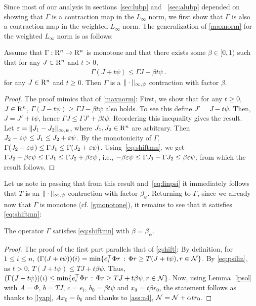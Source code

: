 Since most of our analysis in sections~\ref{sec:lubp} and ~\ref{sec:alubp} depended on showing that $\Gamma$ is a contraction map in the $L_\infty$ norm, we first show that $\Gamma$ is also a contraction map in the weighted $L_\infty$ norm.
The generalization of  \cref{maxnorm} for the weighted $L_{\infty}$ norm is as follows:
\begin{lemma}\label{maxnormmn}
Assume that $\Gamma: \mathrm{R}^n \to \mathrm{R}^n$ is monotone and 
that there exists some $\beta\in [0,1)$ such that for any $J\in \mathrm{R}^n$ and $t>0$,
\begin{align}
\label{eq:shiftmn}
\Gamma( J + t \psi) \le \Gamma J + \beta t \psi\,.
\end{align} 
for any $J\in \mathrm{R}^n$ and $t\ge 0$.
Then $\Gamma$ is a $\|\cdot\|_{\infty,\psi}$ contraction with factor $\beta$.
\end{lemma}
\begin{proof}
The proof mimics that of  \cref{maxnorm}:
First, we show that for any $t\ge 0$,  $J\in \mathrm{R}^n$,
$\Gamma( J - t \psi) \ge \Gamma J - \beta t \psi$ also holds.
To see this define $J' = J-t\psi$. Then, $J = J'+t\psi$, hence $\Gamma J \le \Gamma J' + \beta t \psi$. Reordering this inequality gives the result.
Let $\varepsilon = \|J_1 - J_2\|_{\infty,\psi}$, where $J_1,J_2\in \mathrm{R}^n$ are arbitrary.
Then $J_2 - \varepsilon \psi \le J_1 \le J_2 + \varepsilon \psi$. 
By the monotonicity of $\Gamma$,
$\Gamma(J_2 - \varepsilon \psi) \le \Gamma J_1 \le \Gamma(J_2 + \varepsilon \psi)$. 
Using~\eqref{eq:shiftmn}, we get 
$\Gamma J_2 - \beta \varepsilon \psi \le \Gamma J_1 \le \Gamma J_2 + \beta \varepsilon \psi$, i.e., $-\beta \varepsilon \psi \le \Gamma J_1 - \Gamma J_2 \le \beta \varepsilon \psi$, from which the result follows.
\end{proof}
Let us note in passing that from this result and~\eqref{eq:linpsi} it immediately follows that $T$ is an $\|\cdot\|_{\infty,\psi}$-contraction with factor $\beta_{\psi}$.
Returning to $\Gamma$,
since we already now that $\Gamma$ is monotone (cf. \cref{gmonotone}), it remains to see that it satisfies \eqref{eq:shiftmn}:
\begin{lemma}\label{gshiftmn}
The operator $\Gamma$ satisfies \eqref{eq:shiftmn} with $\beta = \beta_\psi$.
\end{lemma}
\begin{proof}
The proof of the first part parallels that of \cref{gshift}:
By definition, for $1\le i \le n$,
$(\Gamma (J+t\psi) )(i) = \min\{ e_i^\top \Phi r \,:\, \Phi r \ge T(J+t\psi), r\in \mathcal{N} \}$.
By \cref{eq:psilin}, as $t>0$, $T(J+t\psi) \le TJ + t \beta \psi$. Thus,
$(\Gamma (J+t\psi) )(i) \le 
 \min\{ e_i^\top \Phi r \,:\, \Phi r \ge TJ+t\beta \psi, r\in \mathcal{N} \}$.
Now, using Lemma~\ref{lpsol} with $A=\Phi$, $b=TJ$, $c=e_i$,
 $b_0=\beta t \psi$ 
and $x_0=t \beta r_0$, the statement follows
as thanks to \cref{lyap}, $A x_0 = b_0$ and thanks to
\cref{ass:n4}, $\mathcal{N} = \mathcal{N} + \alpha t r_0$.
\end{proof}
